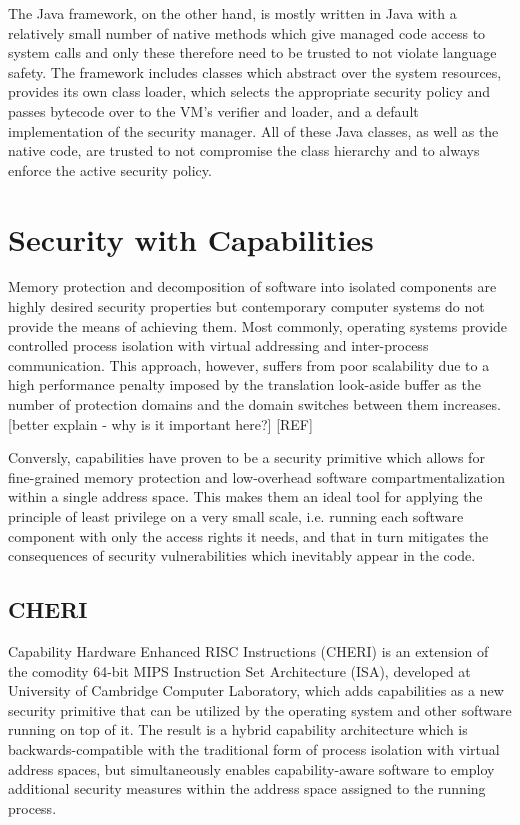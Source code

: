 \documentclass[a4paper,12pt,twoside,openright]{report}
\begin{document}
The Java framework, on the other hand, is mostly written in Java with a relatively small number of native methods which give managed code access to system calls and only these therefore need to be trusted to not violate language safety. The framework includes classes which abstract over the system resources, provides its own class loader, which selects the appropriate security policy and passes bytecode over to the VM's verifier and loader, and a default implementation of the security manager. All of these Java classes, as well as the native code, are trusted to not compromise the class hierarchy and to always enforce the active security policy.

\section{Security with Capabilities}

Memory protection and decomposition of software into isolated components are highly desired security properties but contemporary computer systems do not provide the means of achieving them. Most commonly, operating systems provide controlled process isolation with virtual addressing and inter-process communication. This approach, however, suffers from poor scalability due to a high performance penalty imposed by the translation look-aside buffer as the number of protection domains and the domain switches between them increases. [better explain - why is it important here?] [REF] 

Conversly, capabilities have proven to be a security primitive which allows for fine-grained memory protection and low-overhead software compartmentalization within a single address space. This makes them an ideal tool for applying the principle of least privilege on a very small scale, i.e. running each software component with only the access rights it needs, and that in turn mitigates the consequences of security vulnerabilities which inevitably appear in the code. 

\subsection{CHERI}

Capability Hardware Enhanced RISC Instructions (CHERI) is an extension of the comodity 64-bit MIPS Instruction Set Architecture (ISA), developed at University of Cambridge Computer Laboratory, which adds capabilities as a new security primitive that can be utilized by the operating system and other software running on top of it. The result is a hybrid capability architecture which is backwards-compatible with the traditional form of process isolation with virtual address spaces, but simultaneously enables capability-aware software to employ additional security measures within the address space assigned to the running process.
\end{document}
